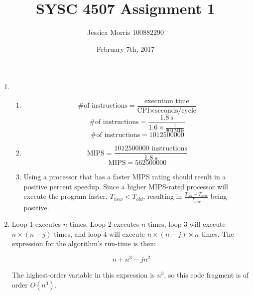 \documentclass{article}
\title{SYSC 4507 Assignment 1}
\date{February 7th, 2017}
\author{Jessica Morris \(100882290\)}
\begin{document}
\maketitle

\begin{enumerate}

\item
\begin{enumerate}
\item
$$ \text{\# of instructions} = \frac{ \text{execution time} }{ \text{CPI} \times \text{seconds/cycle} } $$
$$ \text{\# of instructions} = \frac{ \SI{1.8}{\second} }{ 1.6 \times \frac{1}{ \SI{900}{\mega\hertz} }} $$
$$ \text{\# of instructions} = 1012500000 $$

\item
$$ \text{MIPS} = \frac{1012500000 \text{ instructions}}{\SI{1.8}{\second}} $$
$$ \text{MIPS} = 562500000 $$

\item Using a processor that has a faster MIPS rating should result in a positive percent speedup. Since a higher MIPS-rated processor will execute the program faster, $ T_{new} < T_{old} $, resulting in $ \frac{T_{old} - T_{new}}{T_{new}} $ being positive.

\end{enumerate}

\item Loop 1 executes $ n $ times. Loop 2 executes $ n $ times, loop 3 will execute $ n \times (n - j)  $ times, and loop 4 will execute $ n \times (n - j) \times n $ times. The expression for the algorithm's run-time is then:

$$ n + n^3 -jn^2 $$

The highest-order variable in this expression is $ n^3 $, so this code fragment is of order $ O(n^3) $.

\end{enumerate}
\end{document}
